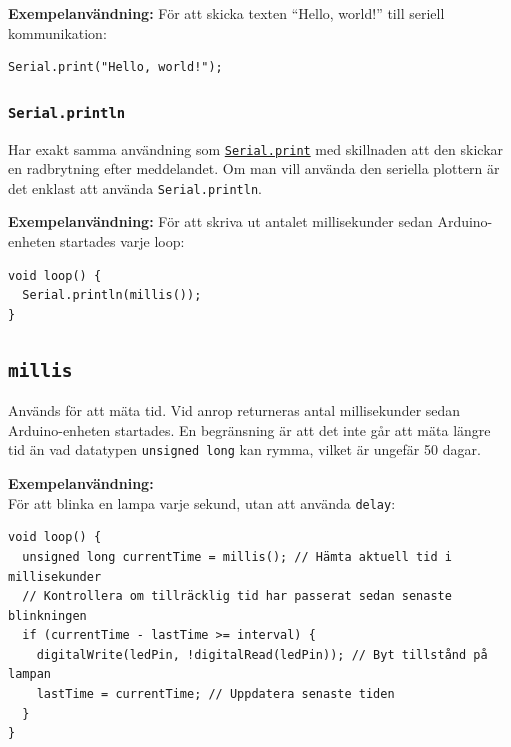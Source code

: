 \documentclass[11pt]{article}
\begin{document}
\textbf{Exempelanvändning:}
För att skicka texten ``Hello, world!'' till seriell kommunikation:
\begin{lstlisting}
Serial.print("Hello, world!");
\end{lstlisting}

\subsubsection{\texttt{Serial.println}} \label{sec:serial.println}
Har exakt samma användning som
\hyperref[sec:serial.print]{\texttt{Serial.print}} med skillnaden att den
skickar en radbrytning efter meddelandet. Om man vill använda den seriella
plottern är det enklast att använda \texttt{Serial.println}.

\textbf{Exempelanvändning:}
För att skriva ut antalet millisekunder sedan Arduino-enheten startades varje
loop:

\begin{lstlisting}
void loop() {
  Serial.println(millis());
}
\end{lstlisting}

\subsection{\texttt{millis}}\label{sec:millis}
Används för att mäta tid. Vid anrop returneras antal millisekunder sedan
Arduino-enheten startades. En begränsning är att det inte går att mäta längre
tid än vad datatypen \texttt{unsigned long} kan rymma, vilket är ungefär 50
dagar.

\textbf{Exempelanvändning:}\\
För att blinka en lampa varje sekund, utan att använda \texttt{delay}:
\begin{lstlisting}
void loop() {
  unsigned long currentTime = millis(); // Hämta aktuell tid i millisekunder
  // Kontrollera om tillräcklig tid har passerat sedan senaste blinkningen
  if (currentTime - lastTime >= interval) {
    digitalWrite(ledPin, !digitalRead(ledPin)); // Byt tillstånd på lampan
    lastTime = currentTime; // Uppdatera senaste tiden
  }
}
\end{lstlisting}
\end{document}
